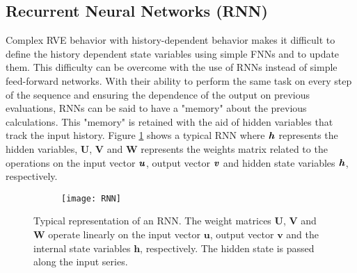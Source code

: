 \subsection{Recurrent Neural Networks (RNN)}\label{nn-rnn}
Complex RVE behavior with history-dependent behavior makes it difficult to define the history dependent state variables using simple FNNs and to update them\cite{wuRecurrentNeuralNetworkaccelerated2020}. This difficulty can be overcome with the use of RNNs instead of simple feed-forward networks. With their ability to perform the same task on every step of the sequence and ensuring the dependence of the output on previous evaluations, RNNs can be said to have a "memory" about the previous calculations. This "memory" is retained with the aid of hidden variables that track the input history. Figure \ref{fig-nn-rnn} shows a typical RNN where $ \textbf{\textit{h}} $ represents the hidden variables, $ \textbf{U} $, $ \textbf{V} $ and $ \textbf{W} $ represents the weights matrix related to the operations on the input vector $ \textbf{\textit{u}} $, output vector $ \textbf{\textit{v}} $ and hidden state variables $ \textbf{\textit{h}} $, respectively.
\begin{figure}
	\centering
	\begin{subfigure}[t]{0.66\textwidth}
		\texttt{[image: RNN]}
		\caption{}
	\end{subfigure}
	\caption{Typical representation of an RNN. The weight matrices $ \textbf{U} $, $ \textbf{V} $ and $ \textbf{W} $ operate linearly on the input vector $ \textbf{u} $, output vector $ \textbf{v} $ and the internal state variables $ \textbf{h} $, respectively. The hidden state is passed along the input series.}\label{fig-nn-rnn}
\end{figure}

